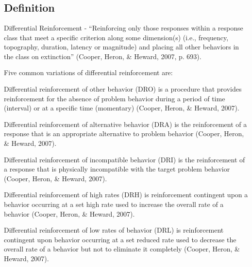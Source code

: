\section[\fourdTwentyOne{}]{\fourdTwentyOne{}%
              }
\subsection{Definition} 
Differential Reinforcement - ``Reinforcing only those responses within a response class that meet a specific criterion along some dimension(s) (i.e., frequency, topography, duration, latency or magnitude) and placing all other behaviors in the class on extinction'' (Cooper, Heron, \& Heward, 2007, p. 693).

Five common variations of differential reinforcement are: 

Differential reinforcement of other behavior (DRO) is a procedure that provides reinforcement for the absence of problem behavior during a period of time (interval) or at a specific time (momentary) (Cooper, Heron, \& Heward, 2007).

Differential reinforcement of alternative behavior (DRA) is the reinforcement of a response that is an appropriate alternative to problem behavior (Cooper, Heron, \& Heward, 2007).

Differential reinforcement of incompatible behavior (DRI) is the reinforcement of a response that is physically incompatible with the target problem behavior (Cooper, Heron, \& Heward, 2007). 

Differential reinforcement of high rates (DRH) is reinforcement contingent upon a behavior occurring at a set high rate used to increase the overall rate of a behavior (Cooper, Heron, \& Heward, 2007).

Differential reinforcement of low rates of behavior (DRL) is reinforcement contingent upon behavior occurring at a set reduced rate used to decrease the overall rate of a behavior but not to eliminate it completely (Cooper, Heron, \& Heward, 2007).
%
